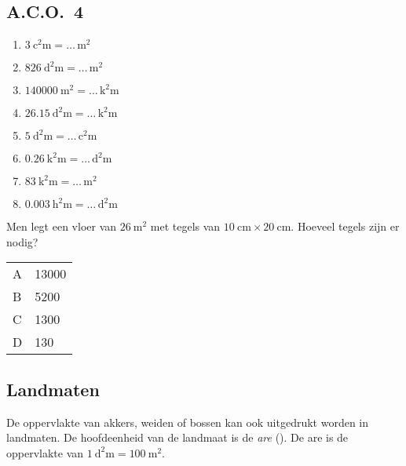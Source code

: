 \documentclass[a4paper,12pt]{article}
\begin{document}
\subsection*{A.C.O.~4}
\begin{multicols}{2}
\begin{enumerate}
  \item \(\SI{3}{\square\centi\metre}=\ldots\,\si{\square\metre}\)
  \item \(\SI{826}{\square\deci\metre}=\ldots\,\si{\square\metre}\)
  \item \(\SI{140000}{\square\metre}=\ldots\,\si{\square\kilo\metre}\)
  \item \(\SI{26.15}{\square\deca\metre}=\ldots\,\si{\square\kilo\metre}\)
  \item \(\SI{5}{\square\deca\metre}=\ldots\,\si{\square\centi\metre}\)
  \item \(\SI{0.26}{\square\kilo\metre}=\ldots\,\si{\square\deci\metre}\)
  \item \(\SI{83}{\square\kilo\metre}=\ldots\,\si{\square\metre}\)
  \item \(\SI{0.003}{\square\hecto\metre}=\ldots\,\si{\square\deci\metre}\)
\end{enumerate}
\end{multicols}

Men legt een vloer van \(\SI{26}{\square\metre}\) met tegels van \(\SI{10}{\centi\metre}\times\SI{20}{\centi\metre}\). Hoeveel tegels zijn er nodig?\\
\begin{tabular}{@{}ll@{}}
A & \num{13000} \\
B & \num{5200} \\
C & \num{1300} \\
D & \num{130} \\
\end{tabular}

\subsection{Landmaten}
De oppervlakte van akkers, weiden of bossen kan ook uitgedrukt worden in landmaten. De hoofdeenheid van de landmaat is de \emph{are} (\si{\are}). De are is de oppervlakte van \(\SI{1}{\square\deca\metre}=\SI{100}{\square\metre}\).
\end{document}
